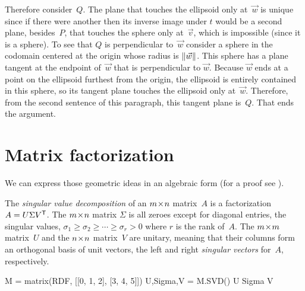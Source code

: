 Therefore consider~$Q$.
The plane that touches the ellipsoid
only at~$\vec{w}$ is unique since if there were another then its inverse image
under $t$
would be a second plane, besides~$P$, 
that touches the sphere only at~$\vec{v}$, which is impossible (since it is a
sphere).
To see that $Q$ is perpendicular to~$\vec{w}$ consider a sphere in the codomain
centered at the origin whose radius is $\lVert\vec{w}\rVert$.
This sphere has a plane tangent at the endpoint of~$\vec{w}$ 
that is perpendicular
to $\vec{w}$.
Because $\vec{w}$ ends at a point on the ellipsoid furthest from the origin,
the ellipsoid is entirely contained in this sphere, so its tangent plane 
touches the ellipsoid only at~$\vec{w}$.
Therefore, from the second sentence of this paragraph, 
this tangent plane is~$Q$. 
That ends the argument.



\section{Matrix factorization}

We can express those geometric ideas in an algebraic form
(for a proof see \cite{TrefethenBau97}).

The \textit{singular value decomposition} of an $m \! \times \! n$ matrix~$A$
is a factorization $A=U\Sigma {{V}^{\mathsf{T}}}$.
The $m \! \times \! n$ matrix $\Sigma$ 
is all zeroes except for diagonal entries, the singular values, 
$\sigma_1\geq \sigma_2 \geq \cdots \geq \sigma_r> 0$ where $r$ is the
rank of~$A$.
The $m \! \times \! m$ matrix~$U$ and the $n \! \times \! n$ matrix~$V$ are unitary, meaning
that their columns form an orthogonal basis of unit vectors, the left and 
right \textit{singular vectors} for~$A$, respectively. 
\begin{sageoutput}
M = matrix(RDF, [[0, 1, 2], [3, 4, 5]])
U,Sigma,V = M.SVD()
U
Sigma
V  
\end{sageoutput}

